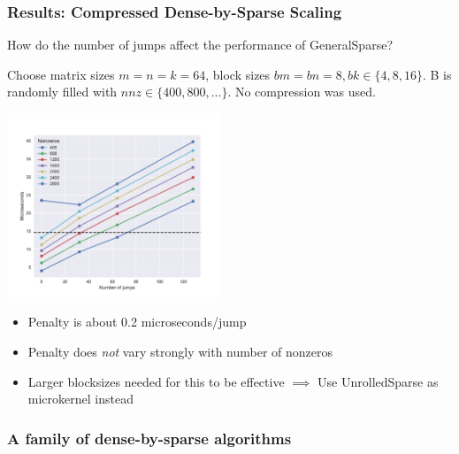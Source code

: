 \documentclass[9pt]{beamer}
\begin{document}
\begin{frame}[fragile]
  \frametitle{Results: Compressed Dense-by-Sparse Scaling}
  How do the number of jumps affect the performance of GeneralSparse?

  Choose matrix sizes $m=n=k=64$, block sizes $bm=bn=8, bk\in \{4,8,16\}.$ 
  B is randomly filled with $nnz\in\{400,800,...\}$. No compression was used.

  \centering
  \includegraphics[height=5.5cm]{images/jump_penalty_new.pdf}

  \begin{itemize}
  \item Penalty is about 0.2 microseconds/jump
  \item Penalty does \emph{not} vary strongly with number of nonzeros
  \item Larger blocksizes needed for this to be effective $\implies$ Use UnrolledSparse as microkernel instead
  \end{itemize}

\end{frame}


\begin{frame}
  \frametitle{A family of dense-by-sparse algorithms}
  
\end{frame}
\end{document}
